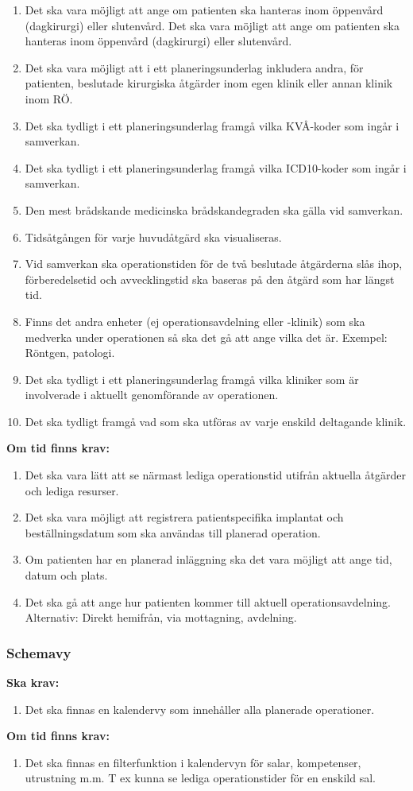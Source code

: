 \documentclass{article}
\begin{document}
\begin{enumerate}
\begin{enumerate}
\item Det ska vara möjligt att ange om patienten ska hanteras inom öppenvård
(dagkirurgi) eller slutenvård. Det ska vara möjligt att ange om patienten ska
hanteras inom öppenvård (dagkirurgi) eller slutenvård.
\item Det ska vara möjligt att i ett planeringsunderlag inkludera andra, för
patienten, beslutade kirurgiska åtgärder inom egen klinik eller annan klinik
inom RÖ.
\item Det ska tydligt i ett planeringsunderlag framgå vilka KVÅ-koder som ingår
i samverkan.
\item Det ska tydligt i ett planeringsunderlag framgå vilka ICD10-koder som
ingår i samverkan.
\item Den mest brådskande medicinska brådskandegraden ska gälla vid samverkan.
\item Tidsåtgången för varje huvudåtgärd ska visualiseras.
\item Vid samverkan ska operationstiden för de två beslutade åtgärderna slås
ihop, förberedelsetid och avvecklingstid ska baseras på den åtgärd som har
längst tid.
\item Finns det andra enheter (ej operationsavdelning eller -klinik) som ska
medverka under operationen så ska det gå att ange vilka det är.
Exempel: Röntgen, patologi.
\item Det ska tydligt i ett planeringsunderlag framgå vilka kliniker som är
involverade i aktuellt genomförande av operationen.
\item Det ska tydligt framgå vad som ska utföras av varje enskild deltagande
klinik.
\end{enumerate}
\textbf{Om tid finns krav:}
\begin{enumerate}
  \item Det ska vara lätt att se närmast lediga operationstid utifrån aktuella
  åtgärder och lediga resurser.
  \item Det ska vara möjligt att registrera patientspecifika implantat och
  beställningsdatum som ska användas till planerad operation.
  \item Om patienten har en planerad inläggning ska det vara möjligt att ange
  tid, datum och plats.
  \item Det ska gå att ange hur patienten kommer till aktuell
  operationsavdelning. Alternativ: Direkt hemifrån, via mottagning, avdelning.
\end{enumerate}
\subsubsection{Schemavy}
\textbf{Ska krav: }
\begin{enumerate}
\item Det ska finnas en kalendervy som innehåller alla planerade operationer.
\end{enumerate}
\textbf{Om tid finns krav:}
\begin{enumerate}
\item Det ska finnas en filterfunktion i kalendervyn för salar, kompetenser, utrustning m.m. T ex kunna se lediga operationstider för en enskild sal.
\end{enumerate}


\end{enumerate}
\end{document}
